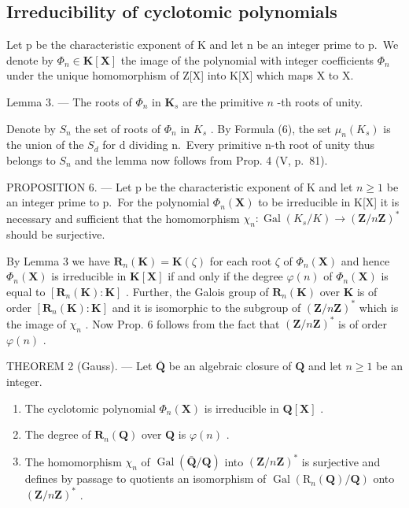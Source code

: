 \subsection{Irreducibility of cyclotomic polynomials}

Let p be the characteristic exponent of K and let n be an integer prime to p.~We denote by \(\Phi_{n} \in \mathbf{K}[\mathbf{X}]\) the image of the polynomial with integer coefficients \(\Phi_{n}\) under the unique homomorphism of Z{[}X{]} into K{[}X{]} which maps X to X.

Lemma 3. --- The roots of \(\Phi_n\) in \(\mathbf{K}_s\) are the primitive \(n\) -th roots of unity.

Denote by \(S_{n}\) the set of roots of \(\Phi_{n}\) in \(K_{s}\) . By Formula (6), the set \(\mu_{n}(K_{s})\) is the union of the \(S_{d}\) for d dividing n.~Every primitive n-th root of unity thus belongs to \(S_{n}\) and the lemma now follows from Prop. 4 (V, p.~81).

PROPOSITION 6. --- Let p be the characteristic exponent of K and let \(n \geqslant 1\) be an integer prime to p.~For the polynomial \(\Phi_{n}(\mathbf{X})\) to be irreducible in K{[}X{]} it is necessary and sufficient that the homomorphism \(\chi_{n}: \operatorname{Gal}(K_{s}/K) \to (\mathbf{Z}/n\mathbf{Z})^{*}\) should be surjective.

By Lemma 3 we have \(\mathbf{R}_n(\mathbf{K}) = \mathbf{K}(\zeta)\) for each root \(\zeta\) of \(\Phi_n(\mathbf{X})\) and hence \(\Phi_n(\mathbf{X})\) is irreducible in \(\mathbf{K}[\mathbf{X}]\) if and only if the degree \(\varphi(n)\) of \(\Phi_n(\mathbf{X})\) is equal to \([\mathbf{R}_n(\mathbf{K}) : \mathbf{K}]\) . Further, the Galois group of \(\mathbf{R}_n(\mathbf{K})\) over \(\mathbf{K}\) is of order \([\mathbf{R}_n(\mathbf{K}) : \mathbf{K}]\) and it is isomorphic to the subgroup of \((\mathbf{Z}/n\mathbf{Z})^*\) which is the image of \(\chi_n\) . Now Prop. 6 follows from the fact that \((\mathbf{Z}/n\mathbf{Z})^*\) is of order \(\varphi(n)\) .

THEOREM 2 (Gauss). --- Let \(\bar{\mathbf{Q}}\) be an algebraic closure of \(\mathbf{Q}\) and let \(n \geqslant 1\) be an integer.

\begin{enumerate}
\def\labelenumi{\alph{enumi})}
\item
  The cyclotomic polynomial \(\Phi_n(\mathbf{X})\) is irreducible in \(\mathbf{Q}[\mathbf{X}]\) .
\item
  The degree of \(\mathbf{R}_n(\mathbf{Q})\) over \(\mathbf{Q}\) is \(\varphi(n)\) .
\item
  The homomorphism \(\chi_{n}\) of \(\operatorname{Gal}(\bar{\mathbf{Q}} / \mathbf{Q})\) into \((\mathbf{Z} / n\mathbf{Z})^{*}\) is surjective and defines by passage to quotients an isomorphism of \(\operatorname{Gal}(\mathrm{R}_n(\mathbf{Q}) / \mathbf{Q})\) onto \((\mathbf{Z} / n\mathbf{Z})^{*}\) .
\end{enumerate}

